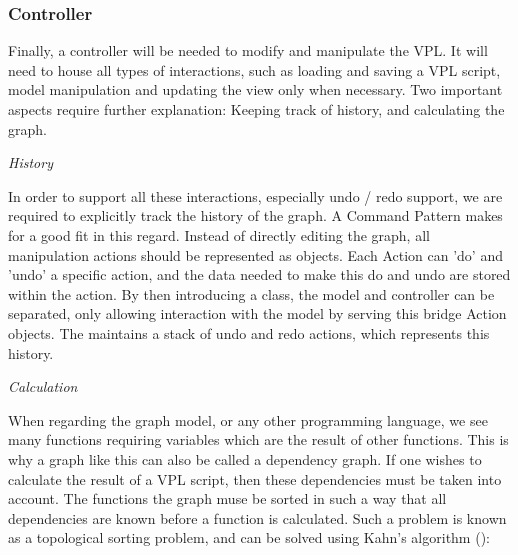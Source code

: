 \subsubsection*{Controller}
\label{sec:method-controller}

Finally, a controller will be needed to modify and manipulate the VPL.
It will need to house all types of interactions, such as loading and saving a VPL script, model manipulation and updating the view only when necessary.
Two important aspects require further explanation: Keeping track of history, and calculating the graph. 

\emph{History}

In order to support all these interactions, especially undo / redo support, we are required to explicitly track the history of the graph. 
A Command Pattern \citep{gamma_design_1994} makes for a good fit in this regard.
Instead of directly editing the graph, all manipulation actions should be represented as  objects. 
Each Action can 'do' and 'undo' a specific action, and the data needed to make this do and undo are stored within the action. 
By then introducing a  class, the model and controller can be separated, only allowing interaction with the model by serving this bridge Action objects. The  maintains a stack of undo and redo actions, which represents this history.  


\emph{Calculation}

When regarding the graph model, or any other programming language, we see many functions requiring variables which are the result of other functions. 
This is why a graph like this can also be called a dependency graph. 
If one wishes to calculate the result of a VPL script, then these dependencies must be taken into account. 
The functions the graph muse be sorted in such a way that all dependencies are known before a function is calculated.
Such a problem is known as a topological sorting problem, and can be solved using Kahn's algorithm (): 

